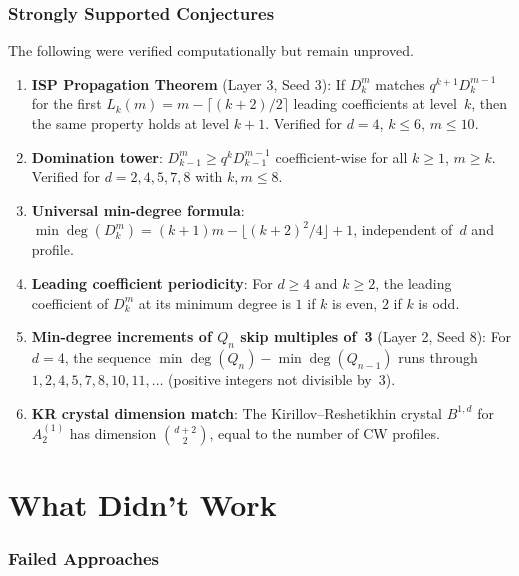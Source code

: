 \documentclass[11pt]{article}
\theoremstyle{definition}
\begin{document}
\section{Strongly Supported Conjectures}\label{sec:yellow}

The following were verified computationally but remain unproved.

\begin{enumerate}
\item \textbf{ISP Propagation Theorem} (Layer 3, Seed 3): If $D_k^m$ matches $q^{k+1} D_k^{m-1}$ for the first $L_k(m) = m - \lceil(k+2)/2\rceil$ leading coefficients at level~$k$, then the same property holds at level $k+1$. Verified for $d = 4$, $k \leq 6$, $m \leq 10$.

\item \textbf{Domination tower}: $D_{k-1}^m \geq q^k D_{k-1}^{m-1}$ coefficient-wise for all $k \geq 1$, $m \geq k$. Verified for $d = 2, 4, 5, 7, 8$ with $k, m \leq 8$.

\item \textbf{Universal min-degree formula}: $\min\deg(D_k^m) = (k+1)m - \lfloor(k+2)^2/4\rfloor + 1$, independent of~$d$ and profile.

\item \textbf{Leading coefficient periodicity}: For $d \geq 4$ and $k \geq 2$, the leading coefficient of $D_k^m$ at its minimum degree is $1$ if $k$ is even, $2$ if $k$ is odd.

\item \textbf{Min-degree increments of $Q_n$ skip multiples of~3} (Layer 2, Seed 8): For $d = 4$, the sequence $\min\deg(Q_n) - \min\deg(Q_{n-1})$ runs through $1, 2, 4, 5, 7, 8, 10, 11, \ldots$ (positive integers not divisible by~3).

\item \textbf{KR crystal dimension match}: The Kirillov--Reshetikhin crystal $B^{1,d}$ for $A_2^{(1)}$ has dimension $\binom{d+2}{2}$, equal to the number of CW profiles.
\end{enumerate}


\part{What Didn't Work}

\section{Failed Approaches}\label{sec:failed}
\end{document}
